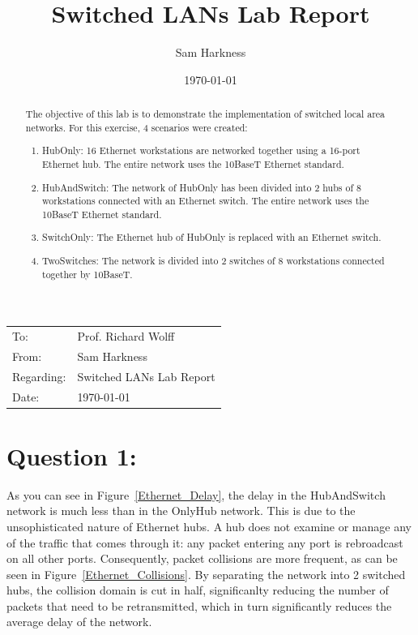 \documentclass[letter,12pt]{article}
\title{Switched LANs Lab Report}
\author{Sam Harkness}
\date{\mydate\today}
\begin{document}

\begin{flushleft}
	\begin{tabular}{l l}
		To: & Prof. Richard Wolff \\
		From: & Sam Harkness \\
		Regarding: & Switched LANs Lab Report \\
		Date: & \mydate\today
	\end{tabular}
\end{flushleft}



\begin{abstract}
	\noindent The objective of this lab is to demonstrate the implementation of switched local area networks. For this exercise, 4 scenarios were created:
	\begin{enumerate}
		\item HubOnly: 16 Ethernet workstations are networked together using a 16-port Ethernet hub. The entire network uses the 10BaseT Ethernet standard.
		\item HubAndSwitch: The network of HubOnly has been divided into 2 hubs of 8 workstations connected with an Ethernet switch.  The entire network uses the 10BaseT Ethernet standard.
		\item SwitchOnly: The Ethernet hub of HubOnly is replaced with an Ethernet switch.
		\item TwoSwitches: The network is divided into 2 switches of 8 workstations connected together by 10BaseT.
	\end{enumerate}
\end{abstract}

\section{Question 1:}
	As you can see in Figure~\ref{Ethernet_Delay}, the delay in the HubAndSwitch network is much less than in the OnlyHub network.  This is due to the unsophisticated nature of Ethernet hubs. A hub does not examine or manage any of the traffic that comes through it: any packet entering any port is rebroadcast on all other ports. Consequently, packet collisions are more frequent, as can be seen in Figure~\ref{Ethernet_Collisions}.  By separating the network into 2 switched hubs, the collision domain is cut in half, significanlty reducing the number of packets that need to be retransmitted, which in turn significantly reduces the average delay of the network.
\end{document}

